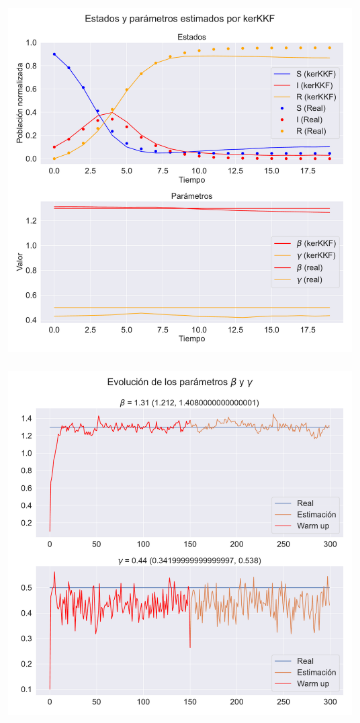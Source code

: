 \begin{figure}[h]
    \centering
    \begin{subfigure}[b]{0.49\textwidth}
    \centering
         \includegraphics[width=\linewidth]{img/content/chapter4/nonlinear_filters_sir_params.pdf}
    \caption{}
    \end{subfigure}
   \begin{subfigure}[b]{0.49\textwidth}
   \centering
       \includegraphics[width=\linewidth]{img/content/chapter4/nonlinear_filters_sir_params_evolution.pdf}

\end{subfigure}
\end{figure}
